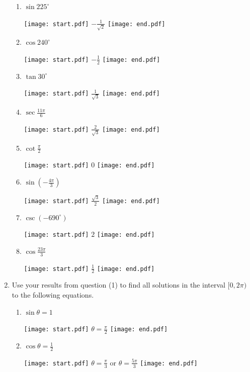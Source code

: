 \documentclass[12pt]{article}
\begin{document}
\begin{enumerate}
\begin{enumerate}
\item $\sin{225^\circ}$

\texttt{[image: start.pdf]}
{$-\frac{1}{\sqrt{2}}$}
\texttt{[image: end.pdf]}


\item $\cos{240^\circ}$

\texttt{[image: start.pdf]}
{$-\frac{1}{2}$}
\texttt{[image: end.pdf]}


\item $\tan{30^\circ}$

\texttt{[image: start.pdf]}
{$\frac{1}{\sqrt{3}}$}
\texttt{[image: end.pdf]}


\item $\sec{\frac{11\pi}{6}}$

\texttt{[image: start.pdf]}
{$\frac{2}{\sqrt{3}}$}
\texttt{[image: end.pdf]}


\item $\cot{\frac{\pi}{2}}$

\texttt{[image: start.pdf]}
{$0$}
\texttt{[image: end.pdf]}


\item $\sin{\left(-\frac{4\pi}{3}\right)}$

\texttt{[image: start.pdf]}
{$\frac{\sqrt{3}}{2}$}
\texttt{[image: end.pdf]}


\item $\csc{(-690^\circ)}$

\texttt{[image: start.pdf]}
{$2$}
\texttt{[image: end.pdf]}


\item $\cos{\frac{23\pi}{3}}$

\texttt{[image: start.pdf]}
{$\frac{1}{2}$}
\texttt{[image: end.pdf]}


\end{enumerate}

\item Use your results from question (1) to find all solutions in the interval $[0,2\pi)$ to the following equations.

\begin{enumerate}

\item $\sin{\theta}=1$

\texttt{[image: start.pdf]}
{$\theta=\frac{\pi}{2}$}
\texttt{[image: end.pdf]}


\item $\cos{\theta}=\frac{1}{2}$

\texttt{[image: start.pdf]}
{$\theta=\frac{\pi}{3}$ or $\theta=\frac{5\pi}{3}$}
\texttt{[image: end.pdf]}



\end{enumerate}
\end{enumerate}
\end{document}
